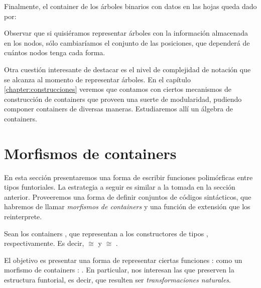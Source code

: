 \begin{example}
Finalmente, el container de los árboles binarios con datos en las hojas queda dado por:



Observar que si quisiéramos representar árboles con la información almacenada en
los nodos, sólo cambiaríamos el conjunto de las posiciones, que dependerá de cuántos nodos tenga cada forma.

Otra cuestión interesante de destacar es el nivel de complejidad de notación que se alcanza al momento de representar árboles. En el capítulo \ref{chapter:construcciones} veremos que contamos con ciertos mecanismos de construcción de containers que proveen una suerte de modularidad, pudiendo componer containers de diversas maneras.
Estudiaremos allí un álgebra de containers.
\end{example}


\section{Morfismos de containers}

En esta sección presentaremos una forma de escribir funciones polimórficas entre tipos funtoriales. La estrategia a seguir es similar a la tomada en la sección anterior. Proveeremos una forma de definir conjuntos de códigos sintácticos, que habremos de llamar {\it morfismos de containers} y una función de extensión que los reinterprete.

Sean los containers
,  \AgdaSymbol{:} 
que representan a los constructores de tipos ,   \AgdaSymbol{:}  \AgdaSymbol{$\to$}  respectivamente.
Es decir,  $\cong$  y  $\cong$ .

El objetivo es presentar una forma de representar ciertas funciones
 : \AgdaSymbol{$\forall$}   \AgdaSymbol{$\to$}  
como un morfismo de containers
 :  \AgdaFunction{$\Rightarrow$} .
En particular, nos interesan las  que 
preserven la estructura funtorial, es decir, que resulten ser {\it transformaciones naturales}.

